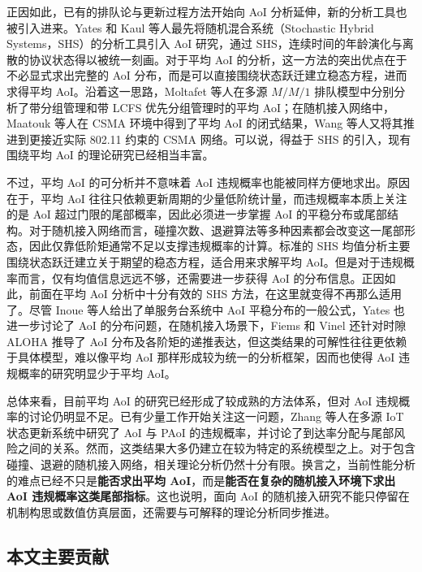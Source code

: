 正因如此，已有的排队论与更新过程方法开始向 AoI 分析延伸，新的分析工具也被引入进来。Yates 和 Kaul 等人最先将随机混合系统（Stochastic Hybrid Systems，SHS）的分析工具引入 AoI 研究，通过 SHS，连续时间的年龄演化与离散的协议状态得以被统一刻画\cite{yates2018age}。对于平均 AoI 的分析，这一方法的突出优点在于不必显式求出完整的 AoI 分布，而是可以直接围绕状态跃迁建立稳态方程，进而求得平均 AoI\cite{yates2020age}。沿着这一思路，Moltafet 等人在多源 $M/M/1$ 排队模型中分别分析了带分组管理和带 LCFS 优先分组管理时的平均 AoI\cite{moltafet2020average}；在随机接入网络中，Maatouk 等人在 CSMA 环境中得到了平均 AoI 的闭式结果\cite{maatouk2020age}，Wang 等人又将其推进到更接近实际 802.11 约束的 CSMA 网络\cite{wang2024analytical}。可以说，得益于 SHS 的引入，现有围绕平均 AoI 的理论研究已经相当丰富。

不过，平均 AoI 的可分析并不意味着 AoI 违规概率也能被同样方便地求出。原因在于，平均 AoI 往往只依赖更新周期的少量低阶统计量，而违规概率本质上关注的是 AoI 超过门限的尾部概率，因此必须进一步掌握 AoI 的平稳分布或尾部结构。对于随机接入网络而言，碰撞次数、退避算法等多种因素都会改变这一尾部形态，因此仅靠低阶矩通常不足以支撑违规概率的计算。标准的 SHS 均值分析主要围绕状态跃迁建立关于期望的稳态方程，适合用来求解平均 AoI。但是对于违规概率而言，仅有均值信息远远不够，还需要进一步获得 AoI 的分布信息。正因如此，前面在平均 AoI 分析中十分有效的 SHS 方法，在这里就变得不再那么适用了。尽管 Inoue 等人给出了单服务台系统中 AoI 平稳分布的一般公式\cite{inoue2019general}，Yates 也进一步讨论了 AoI 的分布问题\cite{yates2020age}，在随机接入场景下，Fiems 和 Vinel 还针对时隙 ALOHA 推导了 AoI 分布及各阶矩的递推表达\cite{fiems2024age}，但这类结果的可解性往往更依赖于具体模型，难以像平均 AoI 那样形成较为统一的分析框架，因而也使得 AoI 违规概率的研究明显少于平均 AoI。

总体来看，目前平均 AoI 的研究已经形成了较成熟的方法体系，但对 AoI 违规概率的讨论仍明显不足。已有少量工作开始关注这一问题，Zhang 等人在多源 IoT 状态更新系统中研究了 AoI 与 PAoI 的违规概率，并讨论了到达率分配与尾部风险之间的关系\cite{zhang2023aoi}。然而，这类结果大多仍建立在较为特定的系统模型之上。对于包含碰撞、退避的随机接入网络，相关理论分析仍然十分有限。换言之，当前性能分析的难点已经不只是\textbf{能否求出平均 AoI}，而是\textbf{能否在复杂的随机接入环境下求出 AoI 违规概率这类尾部指标}。这也说明，面向 AoI 的随机接入研究不能只停留在机制构思或数值仿真层面，还需要与可解释的理论分析同步推进。

\subsection{本文主要贡献}


